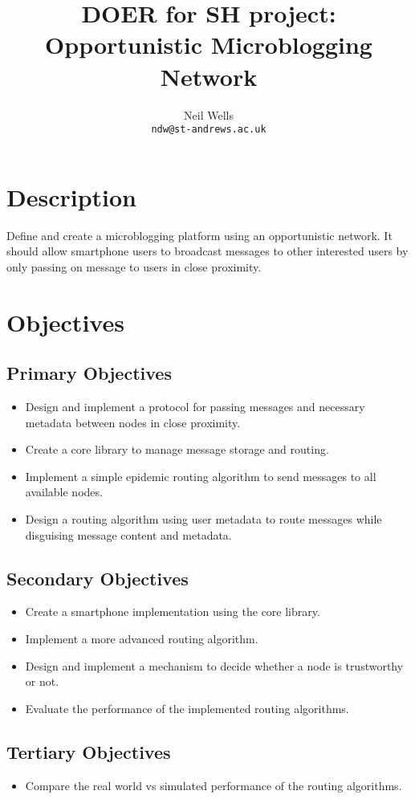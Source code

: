 \documentclass{article}
\title{\textbf{DOER for SH project: Opportunistic Microblogging Network}}
\author{Neil Wells\\
\texttt{ndw@st-andrews.ac.uk}}
\date{}
\begin{document}
\maketitle

\section*{Description}
Define and create a microblogging platform using an opportunistic network. It should allow smartphone users to broadcast messages to other interested users by only passing on message to users in close proximity.

\section*{Objectives}

\subsection*{Primary Objectives}
\begin{itemize}
\item Design and implement a protocol for passing messages and necessary metadata between nodes in close proximity.
\item Create a core library to manage message storage and routing.
\item Implement a simple epidemic routing algorithm to send messages to all available nodes.
\item Design a routing algorithm using user metadata to route messages while disguising message content and metadata.
\end{itemize}

\subsection*{Secondary Objectives}
\begin{itemize}
\item Create a smartphone implementation using the core library.
\item Implement a more advanced routing algorithm.
\item Design and implement a mechanism to decide whether a node is trustworthy or not.
\item Evaluate the performance of the implemented routing algorithms.
\end{itemize}

\subsection*{Tertiary Objectives}
\begin{itemize}
\item Compare the real world vs simulated performance of the routing algorithms.
\end{itemize}
\end{document}
